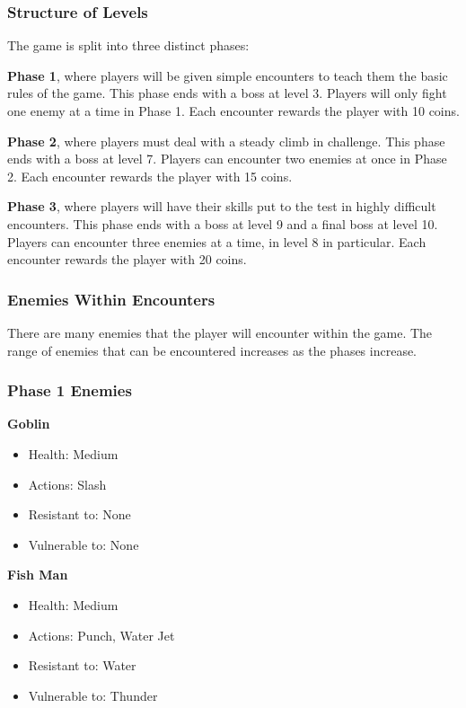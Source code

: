 \subsubsection{Structure of Levels}

The game is split into three distinct phases:

\textbf{Phase 1}, where players will be given simple encounters to teach them the basic rules of the game. This phase ends with a boss at level 3. Players will only fight one enemy at a time in Phase 1. Each encounter rewards the player with 10 coins.

\textbf{Phase 2}, where players must deal with a steady climb in challenge. This phase ends with a boss at level 7. Players can encounter two enemies at once in Phase 2. Each encounter rewards the player with 15 coins.

\textbf{Phase 3}, where players will have their skills put to the test in highly difficult encounters. This phase ends with a boss at level 9 and a final boss at level 10. Players can encounter three enemies at a time, in level 8 in particular. Each encounter rewards the player with 20 coins.

\subsubsection{Enemies Within Encounters}

There are many enemies that the player will encounter within the game. The range of enemies that can be encountered increases as the phases increase.

\subsubsection{Phase 1 Enemies}

\textbf{Goblin}
\begin{itemize}
\item Health: Medium
\item Actions: Slash
\item Resistant to: None
\item Vulnerable to: None
\end{itemize}

\textbf{Fish Man}
\begin{itemize}
\item Health: Medium
\item Actions: Punch, Water Jet
\item Resistant to: Water
\item Vulnerable to: Thunder
\end{itemize}

